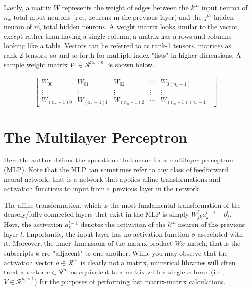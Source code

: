 \documentclass{article}
\begin{document}
Lastly, a matrix $W$ represents the weight of edges between the $k^{th}$
input neuron of $n_x$ total input neurons (i.e., neurons in the previous layer)
and the $j^{th}$ hidden neuron of $n_h^{l}$ total hidden neurons.
A weight matrix looks similar to the vector, except rather than having a single
column, a matrix has a rows and columns--looking like a table. Vectors can
be referred to as rank-1 tensors, matrices as rank-2 tensors, so and so forth
for multiple index "lists" in higher dimensions. A sample weight matrix
$W \in \mathcal{R}^{n_h \times n_x}$ is
shown below.

\begin{align}
	\begin{bmatrix}
		W_{00}         & W_{01}         & W_{02}         & \cdots & W_{0(n_{x}-1)}         \\
		\vdots         & \vdots         & \vdots         & \vdots & \vdots                 \\
		W_{(n_{h}-1)0} & W_{(n_{h}-1)1} & W_{(n_{h}-1)2} & \cdots & W_{(n_{h}-1)(n_{x}-1)}
	\end{bmatrix}
\end{align}

\section{The Multilayer Perceptron}
\quad Here the author defines the operations that occur for a multilayer perceptron (MLP).
Note that the MLP can sometimes refer to any class of feedforward
neural network, that is a network that applies affine transformations and
activation functions to input from a previous layer in the network.

The affine transformation, which is the most fundamental transformation
of the densely/fully connected layers that exist in the MLP
is simply $W_{jk}^{l} a_{k}^{l-1} + b_{j}^{l}$. Here,
the activation $a_k^{l-1}$ denotes the activation of the $k^{th}$ neuron of the
previous layer $l$. Importantly, the input layer has no activation function $\phi$
associated with it. Moreover, the inner dimensions of the matrix product
$Wx$ match, that is the subscripts $k$ are "adjacent" to one another. While you may
observe that the activation vector $a \in \mathcal{R}^{n_a}$ is clearly not a matrix,
numerical libraries will often treat a vector $v \in \mathcal{R}^{n_v}$ as equivalent
to a matrix with a single column (i.e., $V \in \mathcal{R}^{n_v \times 1}$) for
the purposes of performing fast matrix-matrix calculations.
\end{document}
